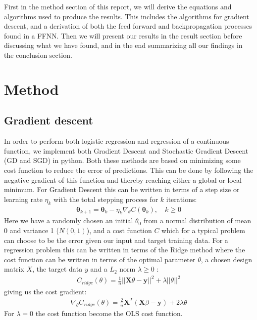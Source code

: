 \documentclass[11pt]{article}
\begin{document}
First in the method section of this report, we will derive the equations and algorithms used to produce the results. This includes the algorithms for gradient descent, and a derivation of both the feed forward and backpropagation processes found in a FFNN. Then we will present our results in the result section before discussing what we have found, and in the end summarizing all our findings in the conclusion section.
\section{Method}
\subsection{Gradient descent}\label{sec:GD}
In order to perform both logistic regression and regression of a continuous function, we implement both Gradient Descent and Stochastic Gradient Descent (GD and SGD) in python. Both these methods are based on minimizing some cost function to reduce the error of predictions. This can be done by following the negative gradient of this function and thereby reaching either a global or local minimum. For Gradient Descent this can be written in terms of a step size or learning rate $\eta_k$ with the total stepping process for $k$ iterations:
\begin{align}
    \label{eq:GD}
    \boldsymbol{\theta}_{k+1} = \boldsymbol{\theta}_k - \eta_k \nabla_\theta C(\boldsymbol{\theta}_k),\quad k \geq 0
\end{align}
Here we have a randomly chosen an initial $\theta_0$ from a normal distribution of mean 0 and variance 1 ($N(0,1)$), and a cost function $C$ which for a typical problem can choose to be the error given our input and target training data. For a regression problem this can be written in terms of the Ridge method where the cost function can be written in terms of the optimal parameter $\theta$, a chosen design matrix $X$, the target data $y$ and a $L_2$ norm $\lambda \geq 0$ :
\begin{align*}
    C_{ridge}(\theta) = \frac{1 }{n }||\boldsymbol{X}\theta - \boldsymbol{y}||^2 + \lambda ||\theta||^2
\end{align*}
giving us the cost gradient:
\begin{align*}
    \nabla_\theta C_{ridge}(\theta) = \frac{2}{n}\boldsymbol{X}^T(\boldsymbol{X}\beta - \boldsymbol{y}) + 2\lambda \theta
\end{align*}
For $\lambda=0$ the cost function become the OLS cost function.
\end{document}
